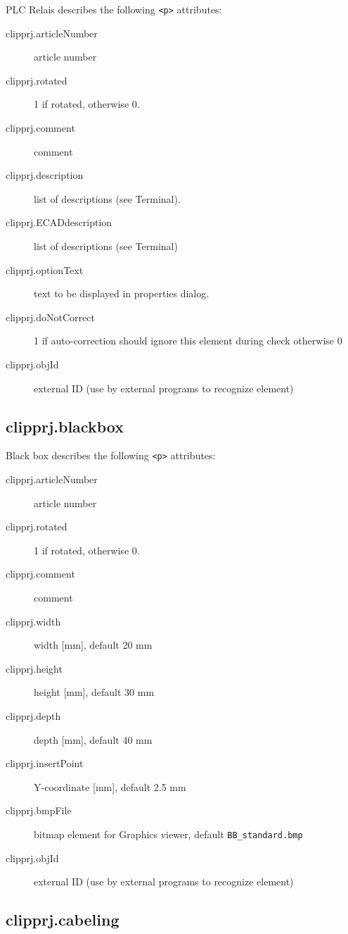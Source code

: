 \documentclass[%
	a4paper,
	oneside,
	listof=numbered,
	parskip=half,
	headsepline=true,
	footsepline=false,
	normalheadings,
	0.7headlines,
	headexclude,
	]{scrbook}
\begin{document}
PLC Relais describes the following \verb|<p>| attributes: 

\begin{description}
	\item[clipprj.articleNumber] article number 
	\item[clipprj.rotated] 1 if rotated, otherwise 0. 
	\item[clipprj.comment] comment 
	\item[clipprj.description] list of descriptions (see Terminal). 
	\item[clipprj.ECADdescription] list of descriptions (see Terminal) 
	\item[clipprj.optionText] text to be displayed in properties dialog. 
	\item[clipprj.doNotCorrect] 1 if auto-correction should ignore this element during check otherwise 0 
	\item[clipprj.objId] external ID (use by external programs to recognize element)
\end{description}

\subsection{clipprj.blackbox}
 
Black box describes the following \verb|<p>| attributes: 

\begin{description}
	\item[clipprj.articleNumber] article number 
	\item[clipprj.rotated] 1 if rotated, otherwise 0. 
	\item[clipprj.comment] comment 
	\item[clipprj.width] width [mm], default 20 mm 
	\item[clipprj.height] height [mm], default 30 mm 
	\item[clipprj.depth] depth [mm], default 40 mm 
	\item[clipprj.insertPoint] Y-coordinate [mm], default 2.5 mm 
	\item[clipprj.bmpFile] bitmap element for Graphics viewer, default \verb|BB_standard.bmp|
	\item[clipprj.objId] external ID (use by external programs to recognize element) 
\end{description}

\subsection{clipprj.cabeling}
 
\end{document}
